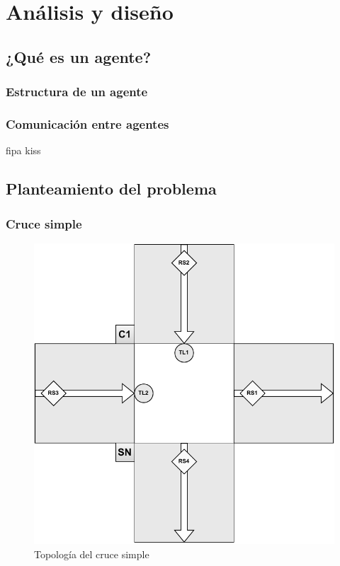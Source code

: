 \chapter{Análisis y diseño}
\section{¿Qué es un agente?}
\subsection{Estructura de un agente}
\subsection{Comunicación entre agentes}
\Gls{fipa} \acrfull{kiss} 

\cite{texbook}
\cite{atlassian}
\cite{ramon}

\newpage
\section{Planteamiento del problema}

\subsection{Cruce simple}
\begin{figure}[H]
    \centering
    \includegraphics[width=1\linewidth]{text/image/DCruc-CS-Topologia.pdf}
    \caption{Topología del cruce simple}
    \label{fig:cruce_simple_topologia}
\end{figure}

